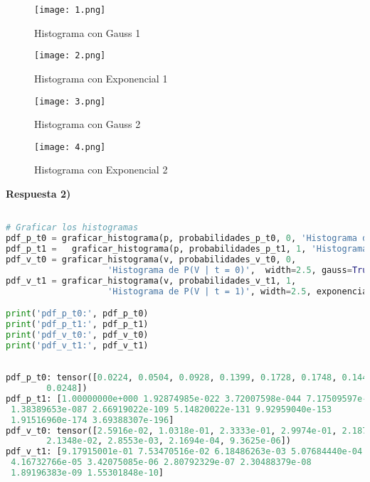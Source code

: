 \documentclass[spanish]{article}
\begin{document}
\newpage
\vspace{15px}
\begin{figure}[h]
    \centering
    \texttt{[image: 1.png]}
    \caption{Histograma con Gauss 1}
    \label{fig:enter-label}
\end{figure}

\newpage

\begin{figure}[h]
    \centering
    \texttt{[image: 2.png]}
    \caption{Histograma con Exponencial 1}
    \label{fig:enter-label}
\end{figure}

\newpage

\begin{figure}[h]
    \centering
    \texttt{[image: 3.png]}
    \caption{Histograma con Gauss 2}
    \label{fig:enter-label}
\end{figure}

\newpage


\begin{figure}[h]
    \centering
    \texttt{[image: 4.png]}
    \caption{Histograma con Exponencial 2}
    \label{fig:enter-label}
\end{figure}

\newpage
\vspace{15px}
\textbf{Respuesta 2)}

\begin{lstlisting}[language=Python, caption=Calculo de Histogramas]

# Graficar los histogramas
pdf_p_t0 = graficar_histograma(p, probabilidades_p_t0, 0, 'Histograma de P(P | t = 0)', gauss=True)
pdf_p_t1 =   graficar_histograma(p, probabilidades_p_t1, 1, 'Histograma de P(P | t = 1)', exponencial=True)
pdf_v_t0 = graficar_histograma(v, probabilidades_v_t0, 0,
                    'Histograma de P(V | t = 0)',  width=2.5, gauss=True)
pdf_v_t1 = graficar_histograma(v, probabilidades_v_t1, 1,
                    'Histograma de P(V | t = 1)', width=2.5, exponencial=True)

print('pdf_p_t0:', pdf_p_t0)
print('pdf_p_t1:', pdf_p_t1)
print('pdf_v_t0:', pdf_v_t0)
print('pdf_v_t1:', pdf_v_t1)
\end{lstlisting}

\begin{lstlisting}[language=Python, caption=Salida]

pdf_p_t0: tensor([0.0224, 0.0504, 0.0928, 0.1399, 0.1728, 0.1748, 0.1448, 0.0982, 0.0546,
        0.0248])
pdf_p_t1: [1.00000000e+000 1.92874985e-022 3.72007598e-044 7.17509597e-066
 1.38389653e-087 2.66919022e-109 5.14820022e-131 9.92959040e-153
 1.91516960e-174 3.69388307e-196]
pdf_v_t0: tensor([2.5916e-02, 1.0318e-01, 2.3333e-01, 2.9974e-01, 2.1873e-01, 9.0665e-02,
        2.1348e-02, 2.8553e-03, 2.1694e-04, 9.3625e-06])
pdf_v_t1: [9.17915001e-01 7.53470516e-02 6.18486263e-03 5.07684440e-04
 4.16732766e-05 3.42075085e-06 2.80792329e-07 2.30488379e-08
 1.89196383e-09 1.55301848e-10]


\end{lstlisting}
\end{document}
